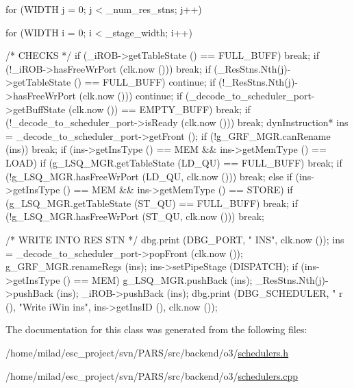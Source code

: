 \begin{DoxyCode}
                                               {
    for (WIDTH j = 0; j < _num_res_stns; j++) {
        for (WIDTH i = 0; i < _stage_width; i++) {
            /* CHECKS */
            if (_iROB->getTableState () == FULL_BUFF) break;
            if (!_iROB->hasFreeWrPort (clk.now ())) break;
            if (_ResStns.Nth(j)->getTableState () == FULL_BUFF) continue;
            if (!_ResStns.Nth(j)->hasFreeWrPort (clk.now ())) continue;
            if (_decode_to_scheduler_port->getBuffState (clk.now ()) == 
      EMPTY_BUFF) break;
            if (!_decode_to_scheduler_port->isReady (clk.now ())) break;
            dynInstruction* ins = _decode_to_scheduler_port->getFront ();
            if (!g_GRF_MGR.canRename (ins)) break;
            if (ins->getInsType () == MEM && ins->getMemType () == LOAD) {
                if (g_LSQ_MGR.getTableState (LD_QU) == FULL_BUFF) break;
                if (!g_LSQ_MGR.hasFreeWrPort (LD_QU, clk.now ())) break;
            } else if (ins->getInsType () == MEM && ins->getMemType () == STORE) 
      {
                if (g_LSQ_MGR.getTableState (ST_QU) == FULL_BUFF) break;
                if (!g_LSQ_MGR.hasFreeWrPort (ST_QU, clk.now ())) break;
            }

            /* WRITE INTO RES STN */
            dbg.print (DBG_PORT, "%
       INS", clk.now ());
            ins = _decode_to_scheduler_port->popFront (clk.now ());
            g_GRF_MGR.renameRegs (ins);
            ins->setPipeStage (DISPATCH);
            if (ins->getInsType () == MEM) g_LSQ_MGR.pushBack (ins);
            _ResStns.Nth(j)->pushBack (ins);
            _iROB->pushBack (ins);
            dbg.print (DBG_SCHEDULER, "%
      r (), "Write iWin ins", ins->getInsID (), clk.now ());
        }
    }
}
\end{DoxyCode}


The documentation for this class was generated from the following files:\begin{DoxyCompactItemize}
\item 
/home/milad/esc\_\-project/svn/PARS/src/backend/o3/\hyperlink{o3_2schedulers_8h}{schedulers.h}\item 
/home/milad/esc\_\-project/svn/PARS/src/backend/o3/\hyperlink{o3_2schedulers_8cpp}{schedulers.cpp}\end{DoxyCompactItemize}
